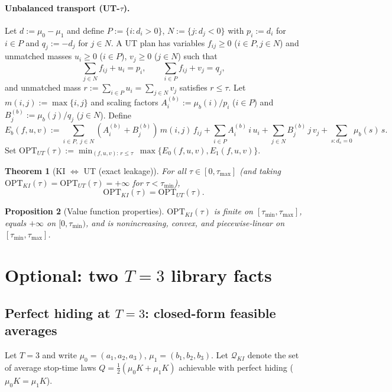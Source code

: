 \documentclass[11pt]{article}
\newtheorem{theorem}{Theorem}[section]
\newtheorem{proposition}[theorem]{Proposition}
\newcommand{\cQ}{\mathcal{Q}}
\begin{document}
\paragraph{Unbalanced transport (UT-$\tau$).}
Let $d:=\mu_0-\mu_1$ and define $P:=\{i:d_i>0\}$, $N:=\{j:d_j<0\}$ with $p_i:=d_i$ for $i\in P$ and $q_j:=-d_j$ for $j\in N$.
A UT plan has variables $f_{ij}\ge 0$ ($i\in P,j\in N$) and unmatched masses $u_i\ge 0$ ($i\in P$), $v_j\ge 0$ ($j\in N$) such that
\[
\sum_{j\in N} f_{ij} + u_i = p_i,\qquad
\sum_{i\in P} f_{ij} + v_j = q_j,
\]
and unmatched mass $r:=\sum_{i\in P}u_i=\sum_{j\in N}v_j$ satisfies $r\le \tau$.
Let $m(i,j):=\max\{i,j\}$ and scaling factors $A_i^{(b)}:=\mu_b(i)/p_i$ ($i\in P$) and $B_j^{(b)}:=\mu_b(j)/q_j$ ($j\in N$).
Define
\[
E_b(f,u,v):=\sum_{i\in P,\ j\in N} (A_i^{(b)}+B_j^{(b)})\,m(i,j)\,f_{ij}
+\sum_{i\in P} A_i^{(b)}\, i\, u_i
+\sum_{j\in N} B_j^{(b)}\, j\, v_j
+\sum_{s:d_s=0} \mu_b(s)\, s.
\]
Set $\mathrm{OPT}_{UT}(\tau):=\min_{(f,u,v):\,r\le \tau}\ \max\{E_0(f,u,v),E_1(f,u,v)\}$.

\begin{theorem}[KI $\Leftrightarrow$ UT (exact leakage)]\label{thm:ki-ut}
For all $\tau\in[0,\tau_{\max}]$ (and taking $\mathrm{OPT}_{KI}(\tau)=\mathrm{OPT}_{UT}(\tau)=+\infty$ for $\tau<\tau_{\min}$),
\[
\mathrm{OPT}_{KI}(\tau)=\mathrm{OPT}_{UT}(\tau).
\]
\end{theorem}

\begin{proposition}[Value function properties]\label{prop:value}
$\mathrm{OPT}_{KI}(\tau)$ is finite on $[\tau_{\min},\tau_{\max}]$, equals $+\infty$ on $[0,\tau_{\min})$, and is nonincreasing, convex,
and piecewise-linear on $[\tau_{\min},\tau_{\max}]$.
\end{proposition}

\section{Optional: two $T=3$ library facts}\label{app:small}

\subsection{Perfect hiding at $T=3$: closed-form feasible averages}
Let $T=3$ and write $\mu_0=(a_1,a_2,a_3)$, $\mu_1=(b_1,b_2,b_3)$.
Let $\cQ_{KI}$ denote the set of average stop-time laws $Q=\tfrac12(\mu_0K+\mu_1K)$ achievable with perfect hiding ($\mu_0K=\mu_1K$).
\end{document}
